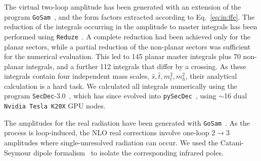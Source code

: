 The virtual two-loop amplitude has been generated with an extension of the program \texttt{GoSam}~\cite{GoSam:2014yla,Braun:2025afl}, and the form factors extracted according to Eq.~\eqref{eq:in:ffe}.
The reduction of the integrals occurring in the amplitude to master integrals has been performed using \texttt{Reduze}~\cite{vonManteuffel:2012np}.
 A complete reduction had been achieved only for the planar sectors, while a partial reduction of the
non-planar sectors was sufficient for the numerical evaluation. This led to 145 planar master
integrals plus 70 non-planar integrals, and a further 112 integrals that differ by a crossing.
As these integrals contain four independent mass scales,
$\hat{s},\hat{t},m_t^2, m_h^2$, their analytical calculation is a hard task.
We calculated all integrals numerically using the program \texttt{SecDec}-3.0~\cite{Borowka:2015mxa}, which has since evolved into \texttt{pySecDec}~\cite{Borowka:2017idc,Heinrich:2023til}, using $\sim$16 dual \texttt{Nvidia Tesla K20X} GPU nodes.

The amplitudes for the real radiation have been generated with \texttt{GoSam}~\cite{GoSam:2014yla,Braun:2025afl}.
As the process is loop-induced, the NLO real corrections involve one-loop $2\to 3$ amplitudes where single-unresolved radiation can occur.
We used the Catani-Seymour dipole formalism~\cite{Catani:1996vz} to isolate the corresponding infrared poles.

